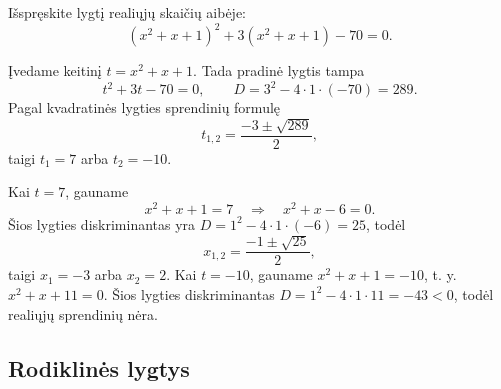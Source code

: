 \documentclass[11pt,a4paper]{scrartcl}
\begin{document}
\begin{example}
Išspręskite lygtį realiųjų skaičių aibėje:
\begin{equation*}
(x^2+x+1)^2+3(x^2+x+1)-70=0.
\end{equation*}
\end{example}
\begin{solution}
Įvedame keitinį \(t=x^2+x+1\). Tada pradinė lygtis tampa
\begin{equation*}
t^2+3t-70=0,\qquad D=3^2-4\cdot1\cdot(-70)=289.
\end{equation*}
Pagal kvadratinės lygties sprendinių formulę
\begin{equation*}
t_{1,2}=\frac{-3\pm\sqrt{289}}{2},
\end{equation*}
taigi \(t_1=7\) arba \(t_2=-10\).

Kai \(t=7\), gauname
\begin{equation*}
x^2+x+1=7\quad\Longrightarrow\quad x^2+x-6=0.
\end{equation*}
Šios lygties diskriminantas yra \(D=1^2-4\cdot1\cdot(-6)=25\), todėl
\begin{equation*}
x_{1,2}=\frac{-1\pm\sqrt{25}}{2},
\end{equation*}
taigi \(x_1=-3\) arba \(x_2=2\).
Kai \(t=-10\), gauname \(x^2+x+1=-10\), t. y. \(x^2+x+11=0\). Šios lygties diskriminantas \(D=1^2-4\cdot1\cdot11=-43<0\), todėl realiųjų sprendinių nėra.
\end{solution}

\subsection{Rodiklinės lygtys}
\end{document}
